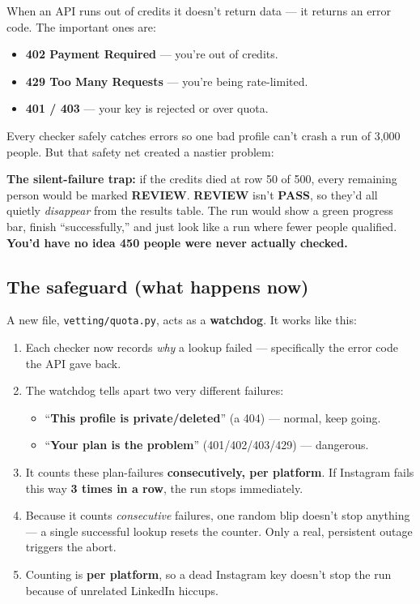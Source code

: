 \documentclass[11pt]{article}
\newcommand{\term}[1]{\textbf{\color{brandpurple}#1}}
\newcommand{\file}[1]{\texttt{\color{inkdark}#1}}
\begin{document}
When an API runs out of credits it doesn't return data — it returns an error
code. The important ones are:
\begin{itemize}
  \item \textbf{402 Payment Required} — you're out of credits.
  \item \textbf{429 Too Many Requests} — you're being rate-limited.
  \item \textbf{401 / 403} — your key is rejected or over quota.
\end{itemize}

Every checker safely catches errors so one bad profile can't crash a run of
3,000 people. But that safety net created a nastier problem:

\begin{analogybox}
\textbf{The silent-failure trap:} if the credits died at row 50 of 500, every
remaining person would be marked \term{REVIEW}. \term{REVIEW} isn't
\term{PASS}, so they'd all quietly \emph{disappear} from the results table. The
run would show a green progress bar, finish ``successfully,'' and just look like
a run where fewer people qualified. \textbf{You'd have no idea 450 people were
never actually checked.}
\end{analogybox}

\subsection{The safeguard (what happens now)}

A new file, \file{vetting/quota.py}, acts as a \term{watchdog}. It works like
this:

\begin{enumerate}[leftmargin=1.6em, itemsep=4pt]
  \item Each checker now records \emph{why} a lookup failed — specifically the
  error code the API gave back.
  \item The watchdog tells apart two very different failures:
  \begin{itemize}
    \item ``\textbf{This profile is private/deleted}'' (a 404) — normal, keep
    going.
    \item ``\textbf{Your plan is the problem}'' (401/402/403/429) — dangerous.
  \end{itemize}
  \item It counts these plan-failures \textbf{consecutively, per platform}. If
  Instagram fails this way \textbf{3 times in a row}, the run stops immediately.
  \item Because it counts \emph{consecutive} failures, one random blip doesn't
  stop anything — a single successful lookup resets the counter. Only a real,
  persistent outage triggers the abort.
  \item Counting is \textbf{per platform}, so a dead Instagram key doesn't stop
  the run because of unrelated LinkedIn hiccups.
\end{enumerate}
\end{document}
